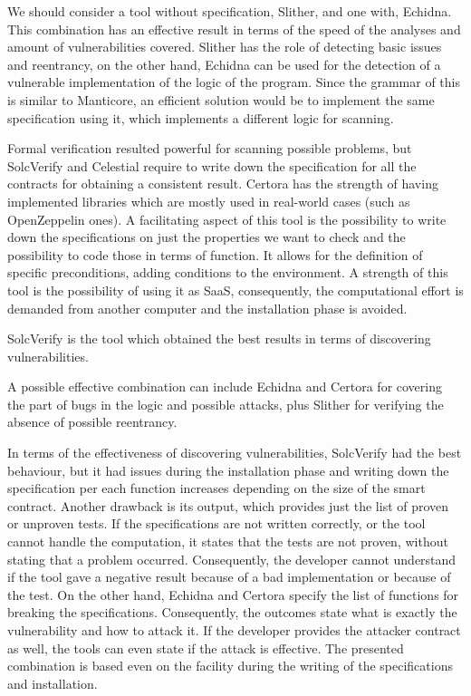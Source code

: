 We should consider a tool without specification, Slither, and one with, Echidna. 
This combination has an effective result in terms of the speed of the analyses and amount of vulnerabilities covered. 
Slither has the role of detecting basic issues and reentrancy, on the other hand, Echidna can be used for the detection of a vulnerable implementation of the logic of the program. 
Since the grammar of this is similar to Manticore, an efficient solution would be to implement the same specification using it, which implements a different logic for scanning. 

Formal verification resulted powerful for scanning possible problems, but SolcVerify and Celestial require to 
write down the specification for all the contracts for obtaining a consistent result. 
Certora has the strength of having implemented libraries which are mostly used in real-world cases (such as OpenZeppelin ones). 
A facilitating aspect of this tool is the possibility to write down the specifications on just the properties we want to check and 
the possibility to code those in terms of function. It allows for the definition of specific preconditions, adding conditions to the environment. 
A strength of this tool is the possibility of using it as SaaS, consequently, the computational effort is demanded from another computer and the installation phase is avoided.

SolcVerify is the tool which obtained the best results in terms of discovering vulnerabilities. 

A possible effective combination can include Echidna and Certora for covering the part of bugs in the logic and possible attacks, 
plus Slither for verifying the absence of possible reentrancy.  

In terms of the effectiveness of discovering vulnerabilities, SolcVerify had the best behaviour, 
but it had issues during the installation phase and writing down the specification per each function increases depending on the size of the smart contract. 
Another drawback is its output, which provides just the list of proven or unproven tests. 
If the specifications are not written correctly, or the tool cannot handle the computation, it states that the tests are not proven, without stating that a problem occurred. 
Consequently, the developer cannot understand if the tool gave a negative result because of a bad implementation or because of the test.
On the other hand, Echidna and Certora specify the list of functions for breaking the specifications. 
Consequently, the outcomes state what is exactly the vulnerability and how to attack it. 
If the developer provides the attacker contract as well, the tools can even state if the attack is effective.
The presented combination is based even on the facility during the writing of the specifications and installation.

